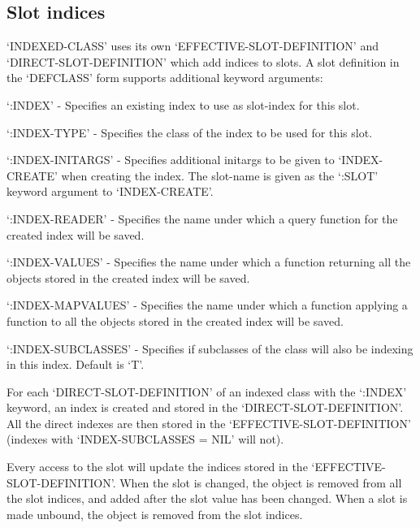 \subsection{ Slot indices}

`INDEXED-CLASS' uses its own `EFFECTIVE-SLOT-DEFINITION' and
`DIRECT-SLOT-DEFINITION' which add indices to slots. A slot
definition in the `DEFCLASS' form supports additional keyword
arguments:

`:INDEX' - Specifies an existing index to use as slot-index for this slot.

`:INDEX-TYPE' - Specifies the class of the index to be used for this
slot.

`:INDEX-INITARGS' - Specifies additional initargs to be given to
`INDEX-CREATE' when creating the index. The slot-name is given as
the `:SLOT' keyword argument to `INDEX-CREATE'.

`:INDEX-READER' - Specifies the name under which a query function
for the created index will be saved.

`:INDEX-VALUES' - Specifies the name under which a function returning
all the objects stored in the created index will be saved.

`:INDEX-MAPVALUES' - Specifies the name under which a function
applying a function to all the objects stored in the created index
will be saved.

`:INDEX-SUBCLASSES' - Specifies if subclasses of the class will
also be indexing in this index. Default is `T'.

For each `DIRECT-SLOT-DEFINITION' of an indexed class with the
`:INDEX' keyword, an index is created and stored in the
`DIRECT-SLOT-DEFINITION'. All the direct indexes are then stored
in the `EFFECTIVE-SLOT-DEFINITION' (indexes with
`INDEX-SUBCLASSES = NIL' will not).

Every access to the slot will update the indices stored in the
`EFFECTIVE-SLOT-DEFINITION'. When the slot is changed, the object
is removed from all the slot indices, and added after the slot
value has been changed. When a slot is made unbound, the object is
removed from the slot indices.

